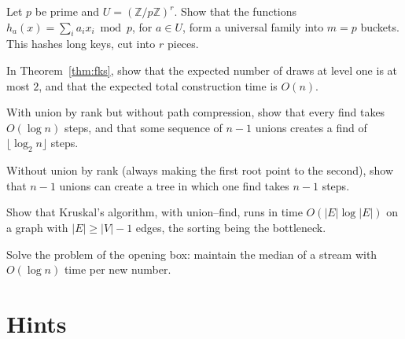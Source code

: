 \begin{exercise}[$\star\star$]\label{ex:dotproduct}
Let $p$ be prime and $U=(\mathbb Z/p\mathbb Z)^r$. Show that the functions $h_a(x)=\sum_ia_ix_i\bmod p$, for $a\in U$, form a universal family into $m=p$ buckets. This hashes
long keys, cut into $r$ pieces.
\end{exercise}

\begin{exercise}[$\star\star$]\label{ex:fkstwo}
In Theorem~\ref{thm:fks}, show that the expected number of draws at level one is at most $2$, and that the expected total construction time is $O(n)$.
\end{exercise}

\begin{exercise}[$\star$]\label{ex:rankonly}
With union by rank but without path compression, show that every find takes $O(\log n)$ steps, and that some sequence of $n-1$ unions creates a find of $\lfloor\log_2n\rfloor$ steps.
\end{exercise}

\begin{exercise}[$\star$]\label{ex:compressonly}
Without union by rank (always making the first root point to the second), show that $n-1$ unions can create a tree in which one find takes $n-1$ steps.
\end{exercise}

\begin{exercise}[$\star$]\label{ex:kruskaltime}
Show that Kruskal's algorithm, with union--find, runs in time $O(|E|\log|E|)$ on a graph with $|E|\ge|V|-1$ edges, the sorting being the bottleneck.
\end{exercise}

\begin{exercise}[$\star\star$]\label{ex:streammedian}
Solve the problem of the opening box: maintain the median of a stream with $O(\log n)$ time per new number.
\end{exercise}

\section{Hints}

